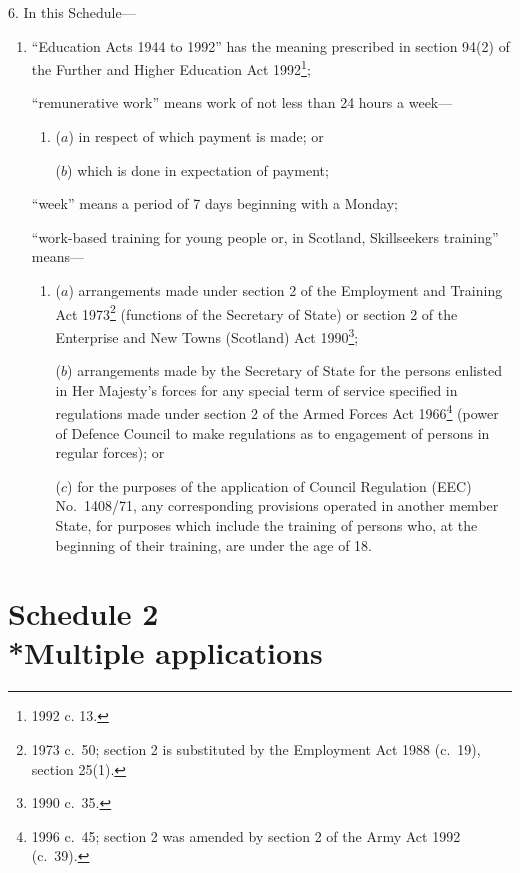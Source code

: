 \documentclass[12pt,a4paper]{article}
\begin{document}
6.  In this Schedule—
\begin{enumerate}\item[]
    “Education Acts 1944 to 1992” has the meaning prescribed in section 94(2) of the Further and Higher Education Act 1992\footnote{1992 c. 13.};

    “remunerative work” means work of not less than 24 hours a week—
\begin{enumerate}\item[]
    ($a$) 
    in respect of which payment is made; or

    ($b$) 
    which is done in expectation of payment;
\end{enumerate}

    “week” means a period of 7 days beginning with a Monday;

    “work-based training for young people or, in Scotland, Skillseekers training” means—
\begin{enumerate}\item[]
    ($a$) 
    arrangements made under section 2 of the Employment and Training Act 1973\footnote{1973 c.\ 50; section 2 is substituted by the Employment Act 1988 (c.\ 19), section 25(1).} (functions of the Secretary of State) or section 2 of the Enterprise and New Towns (Scotland) Act 1990\footnote{1990 c.\ 35.};

    ($b$) 
    arrangements made by the Secretary of State for the persons enlisted in Her Majesty’s forces for any special term of service specified in regulations made under section 2 of the Armed Forces Act 1966\footnote{1996 c.\ 45; section 2 was amended by section 2 of the Army Act 1992 (c.\ 39).} (power of Defence Council to make regulations as to engagement of persons in regular forces); or

    ($c$) 
    for the purposes of the application of Council Regulation (EEC) No.\ 1408/71, any corresponding provisions operated in another member State, for purposes which include the training of persons who, at the beginning of their training, are under the age of 18. 
\end{enumerate}
\end{enumerate}

\part[Schedule 2 --- Multiple applications]{Schedule 2\\*Multiple applications}

\renewcommand\parthead{--- Schedule 2}
\end{document}

